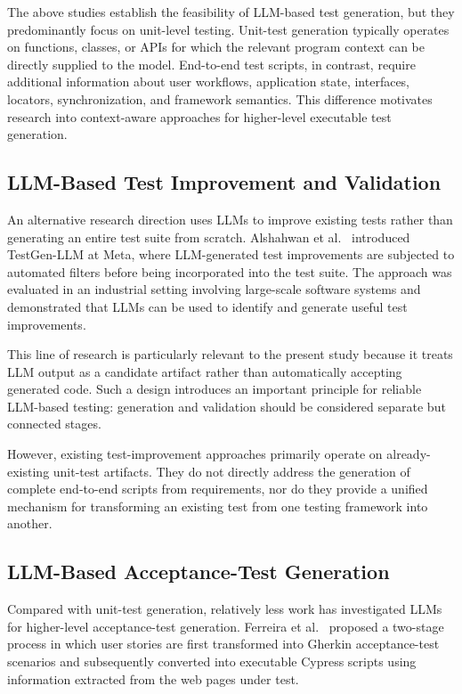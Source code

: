 \documentclass[pdflatex,sn-mathphys-num]{sn-jnl}
\begin{document}
The above studies establish the feasibility of LLM-based test generation,
but they predominantly focus on unit-level testing. Unit-test generation
typically operates on functions, classes, or APIs for which the relevant
program context can be directly supplied to the model. End-to-end test
scripts, in contrast, require additional information about user workflows,
application state, interfaces, locators, synchronization, and framework
semantics. This difference motivates research into context-aware
approaches for higher-level executable test generation.

\subsection{LLM-Based Test Improvement and Validation}
\label{subsec:test-improvement}

An alternative research direction uses LLMs to improve existing tests
rather than generating an entire test suite from scratch. Alshahwan
et al.~\cite{alshahwan2024testgenllm} introduced TestGen-LLM at Meta,
where LLM-generated test improvements are subjected to automated filters
before being incorporated into the test suite. The approach was evaluated
in an industrial setting involving large-scale software systems and
demonstrated that LLMs can be used to identify and generate useful test
improvements.

This line of research is particularly relevant to the present study because
it treats LLM output as a candidate artifact rather than automatically
accepting generated code. Such a design introduces an important principle
for reliable LLM-based testing: generation and validation should be
considered separate but connected stages.

However, existing test-improvement approaches primarily operate on
already-existing unit-test artifacts. They do not directly address the
generation of complete end-to-end scripts from requirements, nor do they
provide a unified mechanism for transforming an existing test from one
testing framework into another.

\subsection{LLM-Based Acceptance-Test Generation}
\label{subsec:acceptance-generation}

Compared with unit-test generation, relatively less work has investigated
LLMs for higher-level acceptance-test generation. Ferreira et
al.~\cite{ferreira2025acceptance} proposed a two-stage process in which
user stories are first transformed into Gherkin acceptance-test scenarios
and subsequently converted into executable Cypress scripts using
information extracted from the web pages under test.
\end{document}
